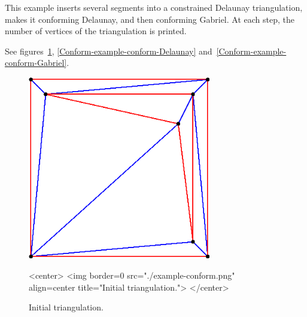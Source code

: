 This example inserts several segments into a constrained Delaunay
triangulation, makes it conforming Delaunay, and then conforming
Gabriel. At each step, the number of vertices of the triangulation is
printed.


See figures~\ref{Conform-example-conform},
\ref{Conform-example-conform-Delaunay}
and~\ref{Conform-example-conform-Gabriel}.

\begin{figure}[htbp]
\begin{ccTexOnly}
\begin{center}
\includegraphics[width=8cm]{Mesh_2/example-conform}
\end{center}
\end{ccTexOnly}
\caption{Initial triangulation.}
\label{Conform-example-conform}

\begin{ccHtmlOnly}
<center>
<img border=0 src="./example-conform.png"
     align=center title="Initial triangulation.">
</center>
\end{ccHtmlOnly}
\end{figure}

